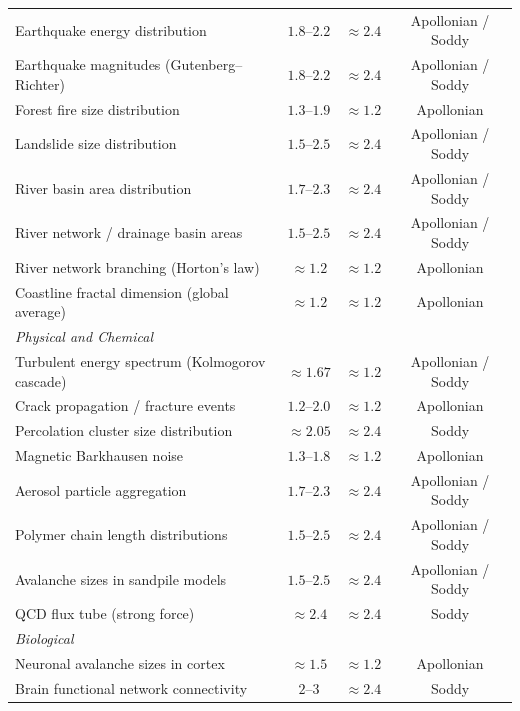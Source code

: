 \documentclass[11pt,a4paper]{article}
\begin{document}
\begin{longtable}{p{6.8cm}ccc}
      \midrule
      Earthquake energy distribution & $1.8$--$2.2$ & $\approx 2.4$ & Apollonian / Soddy \\
      Earthquake magnitudes (Gutenberg--Richter) & $1.8$--$2.2$ & $\approx 2.4$ & Apollonian / Soddy \\
      Forest fire size distribution & $1.3$--$1.9$ & $\approx 1.2$ & Apollonian \\
      Landslide size distribution & $1.5$--$2.5$ & $\approx 2.4$ & Apollonian / Soddy \\
      River basin area distribution & $1.7$--$2.3$ & $\approx 2.4$ & Apollonian / Soddy \\
      River network / drainage basin areas & $1.5$--$2.5$ & $\approx 2.4$ & Apollonian / Soddy \\
      River network branching (Horton's law) & $\approx 1.2$ & $\approx 1.2$ & Apollonian \\
      Coastline fractal dimension (global average) & $\approx 1.2$ & $\approx 1.2$ & Apollonian \\
      \midrule
      \multicolumn{4}{l}{\textit{Physical and Chemical}} \\
      \midrule
      Turbulent energy spectrum (Kolmogorov cascade) & $\approx 1.67$ & $\approx 1.2$ & Apollonian / Soddy \\
      Crack propagation / fracture events & $1.2$--$2.0$ & $\approx 1.2$ & Apollonian \\
      Percolation cluster size distribution & $\approx 2.05$ & $\approx 2.4$ & Soddy \\
      Magnetic Barkhausen noise & $1.3$--$1.8$ & $\approx 1.2$ & Apollonian \\
      Aerosol particle aggregation & $1.7$--$2.3$ & $\approx 2.4$ & Apollonian / Soddy \\
      Polymer chain length distributions & $1.5$--$2.5$ & $\approx 2.4$ & Apollonian / Soddy \\
      Avalanche sizes in sandpile models & $1.5$--$2.5$ & $\approx 2.4$ & Apollonian / Soddy \\
      QCD flux tube (strong force) & $\approx 2.4$ & $\approx 2.4$ & Soddy \\
      \midrule
      \multicolumn{4}{l}{\textit{Biological}} \\
      \midrule
      Neuronal avalanche sizes in cortex & $\approx 1.5$ & $\approx 1.2$ & Apollonian \\
      Brain functional network connectivity & $2$--$3$ & $\approx 2.4$ & Soddy \\

\end{longtable}
\end{document}
